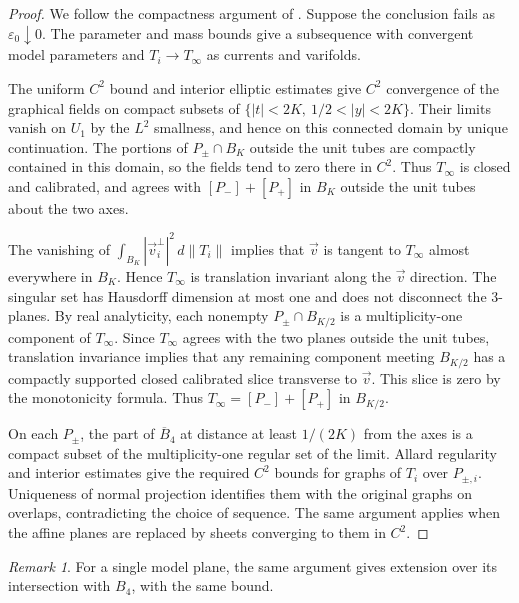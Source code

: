 \documentclass[11pt,a4paper]{article}
\numberwithin{equation}{section}
\theoremstyle{definition}
\theoremstyle{remark}
\newtheorem*{remark*}{Remark}
\newcommand{\dd}{\,d}
\begin{document}
	\begin{proof}
		We follow the compactness argument of \cite[Proposition~3.2]{CL}.
		Suppose the conclusion fails as $\varepsilon_0\downarrow0$.
		The parameter and mass bounds give a subsequence with convergent model
		parameters and $T_i\to T_\infty$ as currents and varifolds.
		
		The uniform $C^2$ bound and interior elliptic estimates give $C^2$
		convergence of the graphical fields on compact subsets of
		$\{|t|<2K,\ 1/2<|y|<2K\}$.
		Their limits vanish on $U_1$ by the $L^2$ smallness, and hence on this
		connected domain by unique continuation. The portions of $P_\pm\cap B_K$
		outside the unit tubes are compactly contained in this domain, so the
		fields tend to zero there in $C^2$.
		Thus $T_\infty$ is closed and calibrated, and agrees with $[P_-]+[P_+]$
		in $B_K$ outside the unit tubes about the two axes.
		
		The vanishing of $\int_{B_K}|\vec v_i^\perp|^2\dd\|T_i\|$ implies
		that $\vec v$ is tangent to $T_\infty$ almost everywhere in $B_K$.
		Hence $T_\infty$ is translation invariant along the $\vec v$ direction.
		The singular set has Hausdorff dimension at most one and does not
		disconnect the 3-planes. By real analyticity, each nonempty
		$P_\pm\cap B_{K/2}$ is a multiplicity-one component of $T_\infty$.
		Since $T_\infty$ agrees with the two planes outside the unit tubes,
		translation invariance implies that any
		remaining component meeting $B_{K/2}$ has a compactly supported closed
		calibrated slice transverse to $\vec v$. This slice is zero by the monotonicity formula.
		Thus $T_\infty=[P_-]+[P_+]$ in $B_{K/2}$.
		
		On each $P_\pm$, the part of $\overline B_4$ at distance at least
		$1/(2K)$ from the axes is a compact subset of the multiplicity-one
		regular set of the limit. Allard regularity \cite[Section~3]{Minter}
		and interior estimates give the required $C^2$ bounds for graphs of
		$T_i$ over $P_{\pm,i}$. Uniqueness of normal projection identifies them
		with the original graphs on overlaps, contradicting the choice of sequence.
		The same argument applies when the affine planes are replaced by sheets
		converging to them in $C^2$.
	\end{proof}
	
	\begin{remark*}
		For a single model plane, the same argument gives extension over
		its intersection with $B_4$, with the same bound.
	\end{remark*}
	
\end{document}
